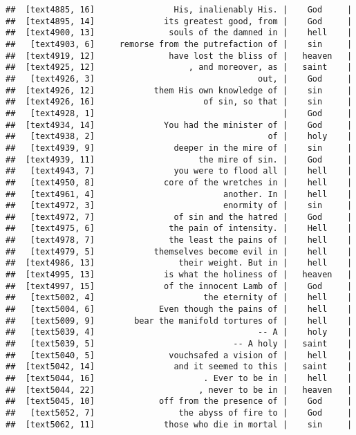 \documentclass[]{article}
\begin{document}
\begin{verbatim}
##  [text4885, 16]                His, inalienably His. |    God     |
##  [text4895, 14]              its greatest good, from |    God     |
##  [text4900, 13]               souls of the damned in |    hell    |
##   [text4903, 6]     remorse from the putrefaction of |    sin     |
##  [text4919, 12]               have lost the bliss of |   heaven   |
##  [text4925, 12]                   , and moreover, as |   saint    |
##   [text4926, 3]                                 out, |    God     |
##  [text4926, 12]            them His own knowledge of |    sin     |
##  [text4926, 16]                      of sin, so that |    sin     |
##   [text4928, 1]                                      |    God     |
##  [text4934, 14]              You had the minister of |    God     |
##   [text4938, 2]                                   of |    holy    |
##   [text4939, 9]                deeper in the mire of |    sin     |
##  [text4939, 11]                     the mire of sin. |    God     |
##   [text4943, 7]                you were to flood all |    hell    |
##   [text4950, 8]              core of the wretches in |    hell    |
##   [text4961, 4]                          another. In |    hell    |
##   [text4972, 3]                          enormity of |    sin     |
##   [text4972, 7]                of sin and the hatred |    God     |
##   [text4975, 6]               the pain of intensity. |    Hell    |
##   [text4978, 7]               the least the pains of |    hell    |
##   [text4979, 5]            themselves become evil in |    hell    |
##  [text4986, 13]                 their weight. But in |    hell    |
##  [text4995, 13]              is what the holiness of |   heaven   |
##  [text4997, 15]              of the innocent Lamb of |    God     |
##   [text5002, 4]                      the eternity of |    hell    |
##   [text5004, 6]             Even though the pains of |    hell    |
##   [text5009, 9]        bear the manifold tortures of |    hell    |
##   [text5039, 4]                                 -- A |    holy    |
##   [text5039, 5]                            -- A holy |   saint    |
##   [text5040, 5]               vouchsafed a vision of |    hell    |
##  [text5042, 14]                and it seemed to this |   saint    |
##  [text5044, 16]                      . Ever to be in |    hell    |
##  [text5044, 22]                     , never to be in |   heaven   |
##  [text5045, 10]             off from the presence of |    God     |
##   [text5052, 7]                 the abyss of fire to |    God     |
##  [text5062, 11]              those who die in mortal |    sin     |

\end{verbatim}
\end{document}
